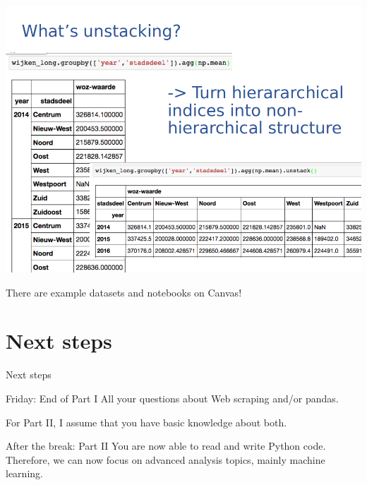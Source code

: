 \documentclass{beamer}
\begin{document}
{\begin{frame}[plain]
{	\includegraphics[width=\paperwidth,height=\paperheight,keepaspectratio]{../../pictures/pandas-example5.png}}
\end{frame}
}


\begin{frame}
There are example datasets and notebooks on Canvas!
\end{frame}


\section{Next steps}
\begin{frame}{Next steps}
\begin{block}{Friday: End of Part I}
	 All your questions about Web scraping and/or pandas.
	
	For Part II, I assume that you have basic knowledge about both.
\end{block}

\begin{block}{After the break: Part II}
You are now able to read and write Python code. Therefore, we can now focus on advanced analysis topics, mainly machine learning.
\end{block}
\end{frame}
\end{document}
